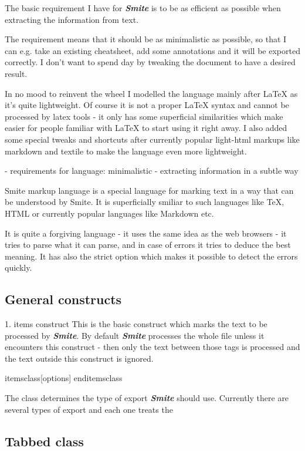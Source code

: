 \documentclass[a4paper,11pt]{article}
\newcommand{\smite}{\emph{\textbf{Smite{}}}}
\begin{document}
The basic requirement I have for \smite{} is to be as efficient as possible
when extracting the information from text.

The requirement means that it should be as minimalistic as possible, so that I
can e.g. take an existing cheatsheet, add some annotations and it will be
exported correctly. I don't want to spend day by tweaking the document to have
a desired result.

In no mood to reinvent the wheel I modelled the language mainly after LaTeX as
it's quite lightweight. Of course it is not a proper LaTeX syntax and cannot be
processed by latex tools - it only has some superficial similarities which make
easier for people familiar with LaTeX to start using it right away.  I also
added some special tweaks and shortcuts after currently popular light-html
markups like markdown and textile to make the language even more lightweight.

- requirements for language: minimalistic - extracting information in a subtle
way

Smite markup language is a special language for marking text in a way that can
be understood by Smite. It is superficially smiliar to such languages like TeX,
HTML or currently popular languages like Markdown etc.

It is quite a forgiving language - it uses the same idea as the web
browsers - it tries to parse what it can parse, and in case of errors it tries
to deduce the best meaning. It has also the strict option which makes it
possible to detect the errors quickly.
\subsection{General constructs}

1.  items construct This is the basic construct which marks the text to
be processed by \smite{}. By default \smite{} processes the whole file unless it
encounters this construct - then only the text between those tags is processed
and the text outside this construct is ignored.

 items{class}[options]
 enditems{class}

The {class} determines the type of export \smite{} should use. Currently
there are several types of export and each one treats the

\subsection{Tabbed class}
\end{document}
